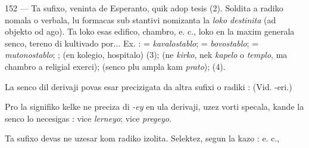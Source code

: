\begin{VUpage}[156]{152}
 --- Ta sufixo, veninta de Esperanto, quik adop\cc
tesis (2). Soldita a radiko nomala o verbala, lu formacas sub\cc
stantivi nomizanta la \textit{loko destinita} (ad objekto od ago). Ta loko\nl
esas edifico, chambro, e. c., loko en la maxim generala senco,\nl
tereno di kultivado por... Ex. :  = \textit{kavalostablo};\nl
{} = \textit{bovostablo};  = \textit{mutonostablo}; ;\nl
{} (en kolegio, hospitalo) (3); \nl
{} (ne \textit{kirko}, nek \textit{kapelo} o \textit{templo},\nl
ma chambro  a religial exerci);  (senco\nl
plu ampla kam \textit{prato}); \nl
{} (4).

La senco dil derivaji povas esar precizigata da altra sufixi\nl
o radiki :  (Vid.\nl
-eri.)

Pro la signifiko kelke ne preciza di \textit{-ey} en ula derivaji,\nl
uzez vorti specala, kande la senco lo necesigas : \nl
{} vice \textit{lerneyo}; \nl
{} vice \textit{pregeyo}.

Ta sufixo devas ne uzesar kom radiko izolita. Selektez,\nl
segun la kazo :  e. c.,\parplein
\end{VUpage}

